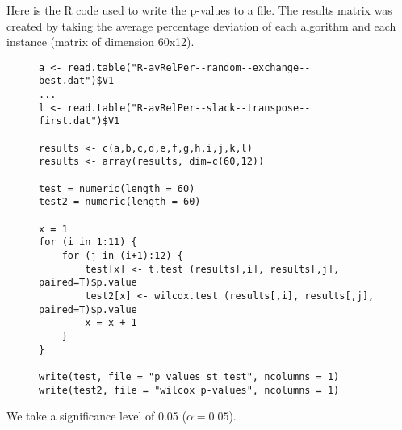 Here is the R code used to write the p-values to a file. The results matrix was created by taking the average percentage deviation of each algorithm and each instance (matrix of dimension 60x12).

\begin{figure}[H]
\begin{lstlisting}
a <- read.table("R-avRelPer--random--exchange--best.dat")$V1
...
l <- read.table("R-avRelPer--slack--transpose--first.dat")$V1

results <- c(a,b,c,d,e,f,g,h,i,j,k,l)
results <- array(results, dim=c(60,12))

test = numeric(length = 60)
test2 = numeric(length = 60)

x = 1
for (i in 1:11) {
	for (j in (i+1):12) {
		test[x] <- t.test (results[,i], results[,j], paired=T)$p.value
		test2[x] <- wilcox.test (results[,i], results[,j], paired=T)$p.value
		x = x + 1
	}
}

write(test, file = "p values st test", ncolumns = 1)
write(test2, file = "wilcox p-values", ncolumns = 1)
\end{lstlisting}
\end{figure}

We take a significance level of 0.05 ($\alpha = 0.05$).


